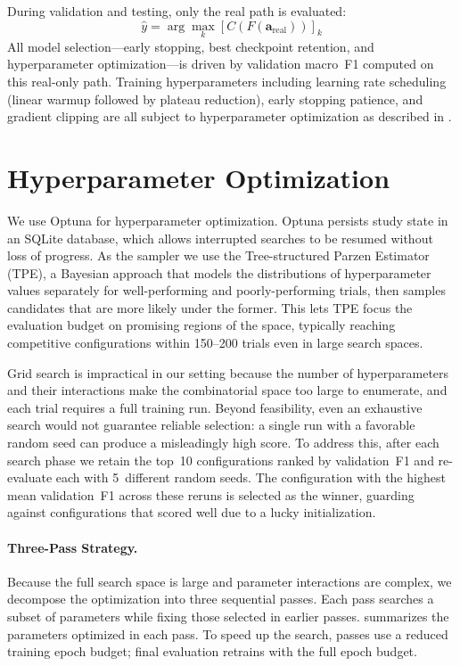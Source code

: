 During validation and testing, only the real path is evaluated:
\begin{equation}
    \hat{y} = \arg\max_k [C(F(\mathbf{a}_{\text{real}}))]_k
\end{equation}
All model selection---early stopping, best checkpoint retention, and hyperparameter optimization---is driven by validation macro~F1 computed on this real-only path. Training hyperparameters including learning rate scheduling (linear warmup followed by plateau reduction), early stopping patience, and gradient clipping are all subject to hyperparameter optimization as described in .

\section{Hyperparameter Optimization}
\label{sec:hpo}

We use Optuna \cite{akiba2019optuna} for hyperparameter optimization. Optuna persists study state in an SQLite database, which allows interrupted searches to be resumed without loss of progress. As the sampler we use the Tree-structured Parzen Estimator (TPE), a Bayesian approach that models the distributions of hyperparameter values separately for well-performing and poorly-performing trials, then samples candidates that are more likely under the former. This lets TPE focus the evaluation budget on promising regions of the space, typically reaching competitive configurations within 150--200 trials even in large search spaces.

Grid search is impractical in our setting because the number of hyperparameters and their interactions make the combinatorial space too large to enumerate, and each trial requires a full training run. Beyond feasibility, even an exhaustive search would not guarantee reliable selection: a single run with a favorable random seed can produce a misleadingly high score. To address this, after each search phase we retain the top~10 configurations ranked by validation~F1 and re-evaluate each with 5~different random seeds. The configuration with the highest mean validation~F1 across these reruns is selected as the winner, guarding against configurations that scored well due to a lucky initialization.

\paragraph{Three-Pass Strategy.}
\label{sec:three-pass}
Because the full search space is large and parameter interactions are complex, we decompose the optimization into three sequential passes. Each pass searches a subset of parameters while fixing those selected in earlier passes.  summarizes the parameters optimized in each pass. To speed up the search, passes use a reduced training epoch budget; final evaluation retrains with the full epoch budget.

